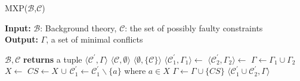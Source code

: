\documentclass[12pt,a4paper]{article}
\begin{document}
\begin{algorithm}[H]
	\footnotesize
	\caption{MXP($\mathcal{B}$,$\mathcal{C}$)}
	\label{alg:mxp}
	\textbf{Input:} $\mathcal{B}$: Background theory, $\mathcal{C}$: the set of possibly faulty constraints  \\
	\textbf{Output:} $\Gamma$, a set of minimal conflicts
	\begin{algorithmic}[1]
		\State {}
		\State \Return {$\emptyset$}
		\EndIf
		\State \Return {$\Gamma$}
		
		\medskip
		 {$\mathcal{B}, \mathcal{C}$} \textbf{returns} a tuple $\langle \mathcal{C}^{\prime}, \Gamma \rangle$
		\State \Return $\langle \mathcal{C}, \emptyset \rangle$
		\State \Return $\langle \emptyset, \{\mathcal{C}\} \rangle$
		\EndIf
		\State $\langle \mathcal{C}_{1}^{\prime}, \Gamma_{1} \rangle \gets$ 
		\State $\langle \mathcal{C}_{2}^{\prime}, \Gamma_{2} \rangle \gets$ 
		\State $\Gamma \gets \Gamma_{1} \cup \Gamma_{2}$
		\State $X \gets $ 
		\State $CS \gets X$ $\cup$ 
		\State $\mathcal{C}_{1}^{\prime} \gets \mathcal{C}_{1}^{\prime} \backslash \{a\}$ where $a \in X$
		\State $\Gamma \gets \Gamma \cup \{CS\}$
		\EndWhile
		\State \Return $\langle \mathcal{C}_{1}^{\prime} \cup \mathcal{C}_{2}^{\prime}, \Gamma \rangle$
		\EndFunction			
	\end{algorithmic}
\end{algorithm}
\end{document}
